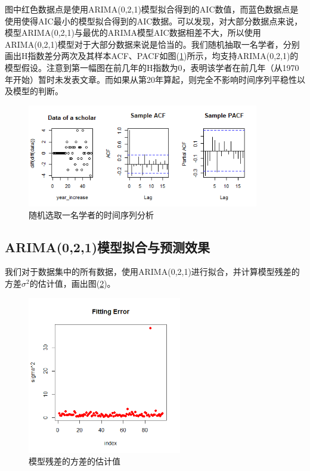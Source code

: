 \documentclass[lang=cn,11pt,a4paper,cite=authoryear]{elegantpaper}
\begin{document}
图中红色数据点是使用ARIMA(0,2,1)模型拟合得到的AIC数值，而蓝色数据点是使用使得AIC最小的模型拟合得到的AIC数据。可以发现，对大部分数据点来说，模型ARIMA(0,2,1)与最优的ARIMA模型AIC数据相差不大，所以使用ARIMA(0,2,1)模型对于大部分数据来说是恰当的。我们随机抽取一名学者，分别画出H指数差分两次及其样本ACF、PACF如图(\ref{fig8})所示，均支持ARIMA(0,2,1)的模型假设。注意到第一幅图在前几年的H指数为0，表明该学者在前几年（从1970年开始）暂时未发表文章。而如果从第20年算起，则完全不影响时间序列平稳性以及模型的判断。

\begin{figure}[H]
	\centering
	\includegraphics[width=0.9\textwidth]{image/sample_scholar.png}
	\caption{随机选取一名学者的时间序列分析}
	\label{fig8}
\end{figure}

\subsection{ARIMA(0,2,1)模型拟合与预测效果}

我们对于数据集中的所有数据，使用ARIMA(0,2,1)进行拟合，并计算模型残差的方差$\sigma^2$的估计值，画出图(\ref{fig9})。

\begin{figure}[H]
	\centering
	\includegraphics[width=0.6\textwidth]{image/sigma2.png}
	\caption{模型残差的方差的估计值}
	\label{fig9}
\end{figure}
\end{document}
